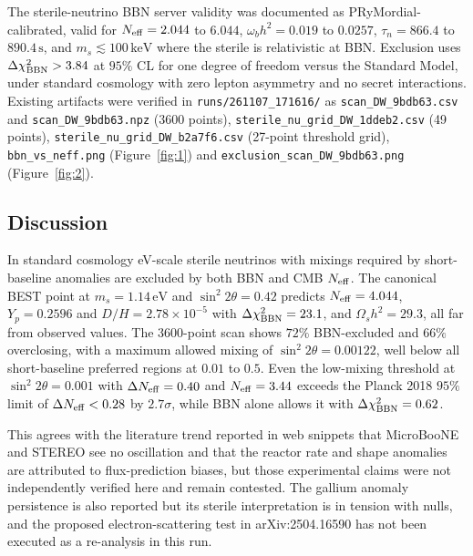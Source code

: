 \documentclass[11pt,a4paper]{article}
\begin{document}
The sterile-neutrino BBN server validity was documented as PRyMordial-calibrated, valid for $N_{\rm eff} = 2.044$ to $6.044$, $\omega_b h^2 = 0.019$ to $0.0257$, $\tau_n = 866.4$ to $890.4\,\mathrm{s}$, and $m_s \lesssim 100\,\mathrm{keV}$ where the sterile is relativistic at BBN. Exclusion uses $\Delta\chi^2_{\rm BBN} > 3.84$ at $95\%$ CL for one degree of freedom versus the Standard Model, under standard cosmology with zero lepton asymmetry and no secret interactions. Existing artifacts were verified in \texttt{runs/\allowbreak{}261107\_\allowbreak{}171616/\allowbreak{}} as \texttt{scan\_\allowbreak{}DW\_\allowbreak{}9bdb63.csv} and \texttt{scan\_\allowbreak{}DW\_\allowbreak{}9bdb63.npz} (3600 points), \texttt{sterile\_\allowbreak{}nu\_\allowbreak{}grid\_\allowbreak{}DW\_\allowbreak{}1ddeb2.csv} (49 points), \texttt{sterile\_\allowbreak{}nu\_\allowbreak{}grid\_\allowbreak{}DW\_\allowbreak{}b2a7f6.csv} (27-point threshold grid), \texttt{bbn\_\allowbreak{}vs\_\allowbreak{}neff.png} (Figure~\ref{fig:1}) and \texttt{exclusion\_\allowbreak{}scan\_\allowbreak{}DW\_\allowbreak{}9bdb63.png} (Figure~\ref{fig:2}).

\subsection{Discussion}
In standard cosmology eV-scale sterile neutrinos with mixings required by short-baseline anomalies are excluded by both BBN and CMB $N_{\rm eff}$. The canonical BEST point at $m_s = 1.14\,\mathrm{eV}$ and $\sin^2 2\theta = 0.42$ predicts $N_{\rm eff} = 4.044$, $Y_p = 0.2596$ and $D/H = 2.78 \times 10^{-5}$ with $\Delta\chi^2_{\rm BBN} = 23.1$, and $\Omega_s h^2 = 29.3$, all far from observed values. The 3600-point scan shows $72\%$ BBN-excluded and $66\%$ overclosing, with a maximum allowed mixing of $\sin^2 2\theta = 0.00122$, well below all short-baseline preferred regions at $0.01$ to $0.5$. Even the low-mixing threshold at $\sin^2 2\theta = 0.001$ with $\Delta N_{\rm eff} = 0.40$ and $N_{\rm eff} = 3.44$ exceeds the Planck 2018 $95\%$ limit of $\Delta N_{\rm eff} < 0.28$ by $2.7\sigma$, while BBN alone allows it with $\Delta\chi^2_{\rm BBN} = 0.62$.

This agrees with the literature trend reported in web snippets that MicroBooNE and STEREO see no oscillation and that the reactor rate and shape anomalies are attributed to flux-prediction biases, but those experimental claims were not independently verified here and remain contested. The gallium anomaly persistence is also reported but its sterile interpretation is in tension with nulls, and the proposed electron-scattering test in arXiv:2504.16590 has not been executed as a re-analysis in this run.
\end{document}
